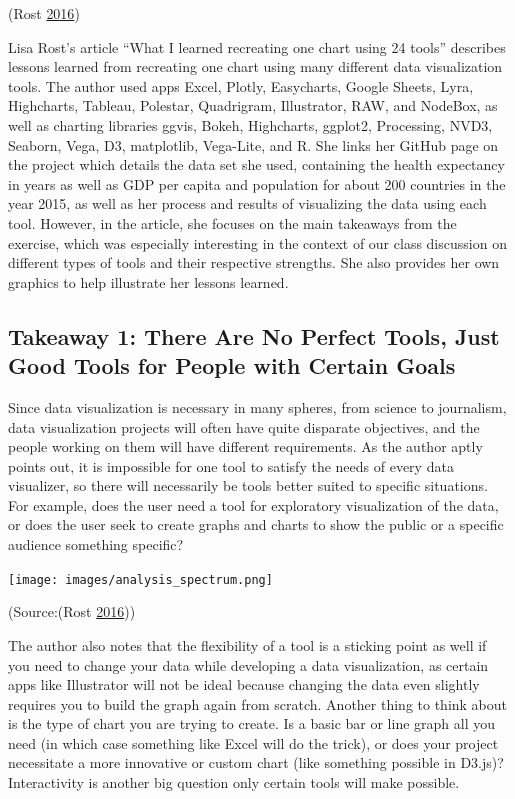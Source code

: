 \documentclass[]{book}
\begin{document}
(Rost \protect\hyperlink{ref-different_tools}{2016})

Lisa Rost's article ``What I learned recreating one chart using 24 tools'' describes lessons learned from recreating one chart using many different data visualization tools. The author used apps Excel, Plotly, Easycharts, Google Sheets, Lyra, Highcharts, Tableau, Polestar, Quadrigram, Illustrator, RAW, and NodeBox, as well as charting libraries ggvis, Bokeh, Highcharts, ggplot2, Processing, NVD3, Seaborn, Vega, D3, matplotlib, Vega-Lite, and R. She links her GitHub page on the project which details the data set she used, containing the health expectancy in years as well as GDP per capita and population for about 200 countries in the year 2015, as well as her process and results of visualizing the data using each tool. However, in the article, she focuses on the main takeaways from the exercise, which was especially interesting in the context of our class discussion on different types of tools and their respective strengths. She also provides her own graphics to help illustrate her lessons learned.

\hypertarget{takeaway-1-there-are-no-perfect-tools-just-good-tools-for-people-with-certain-goals}{%
\subsection{Takeaway 1: There Are No Perfect Tools, Just Good Tools for People with Certain Goals}\label{takeaway-1-there-are-no-perfect-tools-just-good-tools-for-people-with-certain-goals}}

Since data visualization is necessary in many spheres, from science to journalism, data visualization projects will often have quite disparate objectives, and the people working on them will have different requirements. As the author aptly points out, it is impossible for one tool to satisfy the needs of every data visualizer, so there will necessarily be tools better suited to specific situations. For example, does the user need a tool for exploratory visualization of the data, or does the user seek to create graphs and charts to show the public or a specific audience something specific?

\texttt{[image: images/analysis\_spectrum.png]}

(Source:(Rost \protect\hyperlink{ref-different_tools}{2016}))

The author also notes that the flexibility of a tool is a sticking point as well if you need to change your data while developing a data visualization, as certain apps like Illustrator will not be ideal because changing the data even slightly requires you to build the graph again from scratch. Another thing to think about is the type of chart you are trying to create. Is a basic bar or line graph all you need (in which case something like Excel will do the trick), or does your project necessitate a more innovative or custom chart (like something possible in D3.js)? Interactivity is another big question only certain tools will make possible.
\end{document}
